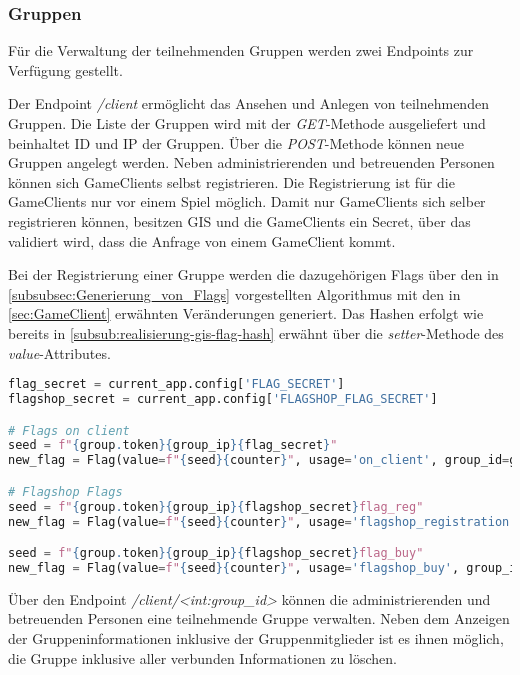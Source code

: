 \subsubsection{Gruppen}
Für die Verwaltung der teilnehmenden Gruppen werden zwei Endpoints zur Verfügung gestellt.

Der Endpoint \textit{/client} ermöglicht das Ansehen und Anlegen von teilnehmenden Gruppen.
Die Liste der Gruppen wird mit der \textit{GET}-Methode ausgeliefert und beinhaltet ID und IP der Gruppen. Über die \textit{POST}-Methode können neue Gruppen angelegt werden. Neben administrierenden und betreuenden Personen können sich GameClients selbst registrieren. Die Registrierung ist für die GameClients nur vor einem Spiel möglich. Damit nur GameClients sich selber registrieren können, besitzen GIS und die GameClients ein Secret, über das validiert wird, dass die Anfrage von einem GameClient kommt.

Bei der Registrierung einer Gruppe werden die dazugehörigen Flags über den in \autoref{subsubsec:Generierung_von_Flags} vorgestellten Algorithmus mit den in \autoref{sec:GameClient} erwähnten Veränderungen generiert. Das Hashen erfolgt wie bereits in \autoref{subsub:realisierung-gis-flag-hash} erwähnt über die \textit{setter}-Methode des \textit{value}-Attributes.

\begin{lstlisting}[language=Python, frame=single, caption={GIS Flaggenerierung}, captionpos=b, label={lst:gis-flag-gen}]
flag_secret = current_app.config['FLAG_SECRET']
flagshop_secret = current_app.config['FLAGSHOP_FLAG_SECRET']

# Flags on client
seed = f"{group.token}{group_ip}{flag_secret}"
new_flag = Flag(value=f"{seed}{counter}", usage='on_client', group_id=group.id)

# Flagshop Flags
seed = f"{group.token}{group_ip}{flagshop_secret}flag_reg"
new_flag = Flag(value=f"{seed}{counter}", usage='flagshop_registration', group_id=group.id)

seed = f"{group.token}{group_ip}{flagshop_secret}flag_buy"
new_flag = Flag(value=f"{seed}{counter}", usage='flagshop_buy', group_id=group.id)
\end{lstlisting}

Über den Endpoint \textit{/client/<int:group\_id>} können die administrierenden und betreuenden Personen eine teilnehmende Gruppe verwalten. Neben dem Anzeigen der Gruppeninformationen inklusive der Gruppenmitglieder ist es ihnen möglich, die Gruppe inklusive aller verbunden Informationen zu löschen.

